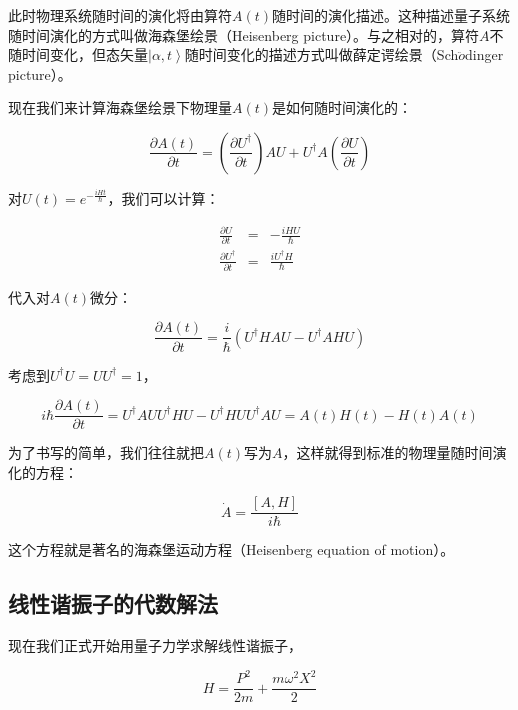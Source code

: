 此时物理系统随时间的演化将由算符$A(t)$随时间的演化描述。这种描述量子系统随时间演化的方式叫做海森堡绘景（Heisenberg picture）。与之相对的，算符$A$不随时间变化，但态矢量$\left| \alpha, t \right\rangle $随时间变化的描述方式叫做薛定谔绘景（Sch$\ddot o$dinger picture）。

现在我们来计算海森堡绘景下物理量$A(t)$是如何随时间演化的：

\begin{equation*}
\frac{\partial A(t) }{\partial t }  = \left( \frac{ \partial U^\dagger }{\partial t } \right) A U + U^\dagger A \left( \frac{ \partial U }{\partial t } \right)
\end{equation*}

对$U(t) = e^{- \frac{i H t}{\hbar}}$，我们可以计算：

\begin{eqnarray}
\frac{\partial U }{\partial t } &=& - \frac{i H U}{\hbar}  \\
\frac{\partial U^\dagger }{\partial t } &=& \frac{i U^\dagger H }{\hbar}
\end{eqnarray}

代入对$A(t)$微分：

\begin{equation*}
\frac{\partial A(t) }{\partial t } = \frac{i}{\hbar} \left( U^\dagger H AU - U^\dagger A H U \right)
\end{equation*}

考虑到$U^\dagger U = U U^\dagger  = 1$，

\begin{equation*}
i \hbar \frac{\partial A(t) }{\partial t }  = U^\dagger A U U^\dagger H U - U^\dagger H U U^\dagger A U = A(t)H(t) - H(t)A(t) 
\end{equation*}

为了书写的简单，我们往往就把$A(t)$写为$A$，这样就得到标准的物理量随时间演化的方程：

\begin{equation}
\dot A = \frac{\left[ A, H  \right]}{i \hbar} 
\end{equation}

这个方程就是著名的海森堡运动方程（Heisenberg equation of motion）。

\subsection{线性谐振子的代数解法}

现在我们正式开始用量子力学求解线性谐振子，

\begin{equation}
H = \frac{P^2}{2m} + \frac{m \omega^2 X^2}{2}
\end{equation}

